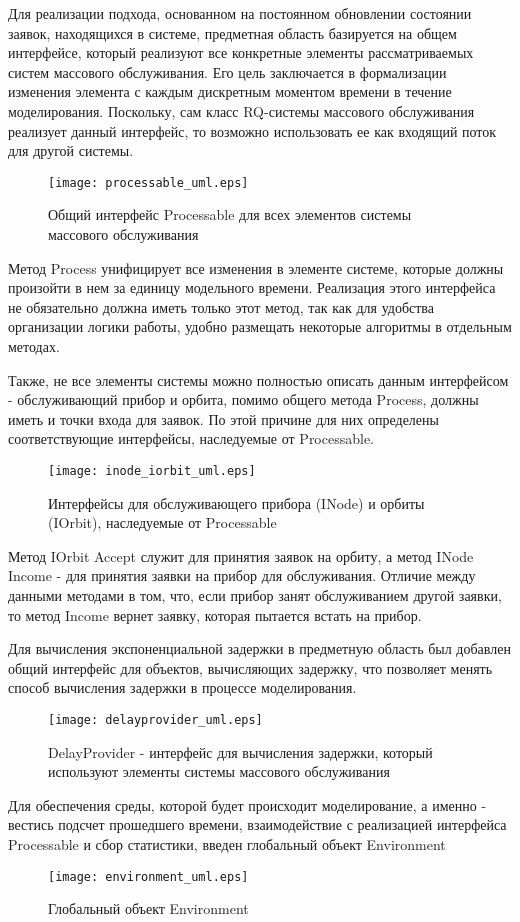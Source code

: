 Для реализации подхода, основанном на постоянном обновлении состоянии заявок, находящихся в системе, предметная область базируется на общем интерфейсе, который реализуют все конкретные элементы рассматриваемых систем массового обслуживания. Его цель заключается в формализации изменения элемента  с каждым дискретным моментом времени в течение моделирования. Поскольку, сам класс RQ-системы массового обслуживания реализует данный интерфейс, то возможно использовать ее как входящий поток для другой системы.
\begin{figure}[H]
	\centering
	\texttt{[image: processable\_uml.eps]}
	\caption{Общий интерфейс Processable для всех элементов системы массового обслуживания}
	\label{processable_uml}
\end{figure}
Метод Process унифицирует все изменения в элементе системе, которые должны произойти в нем за единицу модельного времени. Реализация этого интерфейса не обязательно должна иметь только этот метод, так как для удобства организации логики работы, удобно размещать некоторые алгоритмы в отдельным методах.

Также, не все элементы системы можно полностью описать данным интерфейсом - обслуживающий прибор и орбита, помимо общего метода Process, должны иметь и точки входа для заявок. По этой причине для них определены соответствующие интерфейсы, наследуемые от Processable.
\begin{figure}[H]
	\centering
	\texttt{[image: inode\_iorbit\_uml.eps]}
	\caption{Интерфейсы для обслуживающего прибора (INode) и орбиты (IOrbit), наследуемые от Processable}
	\label{inode_iorbit_uml}
\end{figure}
Метод IOrbit Accept служит для принятия заявок на орбиту, а метод INode Income - для принятия заявки на прибор для обслуживания. Отличие между данными методами в том, что, если прибор занят обслуживанием другой заявки, то метод Income вернет заявку, которая пытается встать на прибор.

Для вычисления экспоненциальной задержки в предметную область был добавлен общий интерфейс для объектов, вычисляющих задержку, что позволяет менять способ вычисления задержки в процессе моделирования.
\begin{figure}[H]
	\centering
	\texttt{[image: delayprovider\_uml.eps]}
	\caption{DelayProvider - интерфейс для вычисления задержки, который используют элементы системы массового обслуживания}
	\label{delayprovider_uml}
\end{figure}

Для обеспечения среды, которой будет происходит моделирование, а именно - вестись подсчет прошедшего времени, взаимодействие с реализацией интерфейса Processable и сбор статистики, введен глобальный объект Environment
\begin{figure}[H]
	\centering
	\texttt{[image: environment\_uml.eps]}
	\caption{Глобальный объект Environment}
	\label{environment_uml}
\end{figure}

